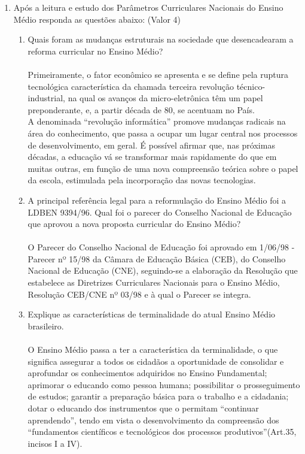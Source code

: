 \documentclass[a4paper, 12pt]{article}
\begin{document}
\begin{enumerate}
\item Após a leitura e  estudo dos Parâmetros Curriculares  Nacionais  do Ensino Médio  responda as questões abaixo: (Valor 4)
  \begin{enumerate}
  \item Quais foram as mudanças estruturais na sociedade que desencadearam a reforma curricular no Ensino Médio?\\\\
     Primeiramente, o fator econômico se apresenta e se define pela ruptura tecnológica característica da chamada terceira revolução técnico-industrial, na qual os avanços da micro-eletrônica têm um papel preponderante, e, a partir década de 80, se acentuam no País.  \\
   A denominada ``revolução informática'' promove mudanças radicais na área do conhecimento, que passa a ocupar um lugar central nos processos de desenvolvimento, em geral. É possível afirmar que, nas próximas décadas, a educação vá se transformar mais rapidamente do que em muitas outras, em função de uma nova compreensão teórica sobre o papel da escola, estimulada pela incorporação das novas tecnologias.      
 \item A principal referência legal para a reformulação do Ensino Médio foi a LDBEN 9394/96. Qual foi o parecer do Conselho Nacional de Educação que aprovou a nova proposta curricular do Ensino Médio?\\\\
        O Parecer do Conselho Nacional de Educação foi aprovado em 1/06/98 - Parecer nº 15/98 
da Câmara de Educação Básica (CEB), do Conselho Nacional de Educação (CNE), seguindo-se a elaboração da Resolução que estabelece as Diretrizes Curriculares Nacionais para o Ensino Médio, Resolução CEB/CNE nº 03/98 e à qual o Parecer se integra.  
\item Explique as características de terminalidade do atual Ensino Médio brasileiro.\\\\
   O Ensino Médio passa a ter a característica da terminalidade, o que significa assegurar a todos os cidadãos a oportunidade de consolidar e aprofundar os conhecimentos adquiridos no Ensino Fundamental; aprimorar o educando como pessoa humana; possibilitar o prosseguimento de estudos; garantir a preparação básica para o trabalho e a cidadania; dotar o educando dos instrumentos que o permitam ``continuar aprendendo'', tendo em vista o desenvolvimento da compreensão dos ``fundamentos científicos e tecnológicos dos processos produtivos''(Art.35, incisos I a IV). \\

\end{enumerate}
\end{enumerate}
\end{document}
